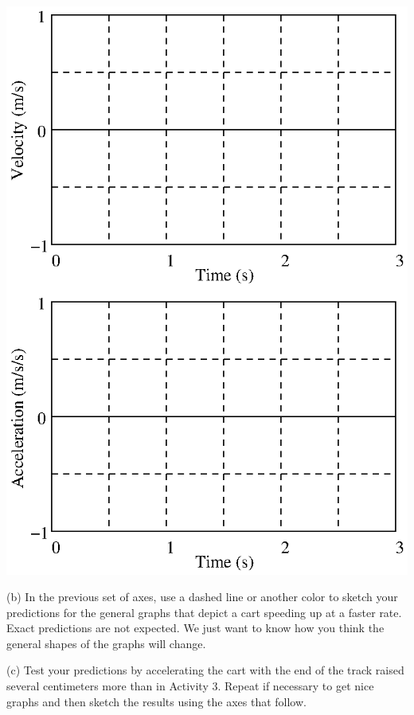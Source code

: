 \vspace{0.3cm}
{\par\centering \includegraphics{changing/changing_fig5.eps} \par}
\vspace{0.3cm}

(b) In the previous set of axes, use a dashed line or another color to sketch
your predictions for the general graphs that depict a cart speeding up at a
faster rate. Exact predictions are not expected. We just want to know how you
think the general shapes of the graphs will change.

(c) Test your predictions by accelerating the cart with the end of the track raised several centimeters more than in Activity 3. Repeat if necessary to get nice graphs and then sketch the results using the axes that follow.


